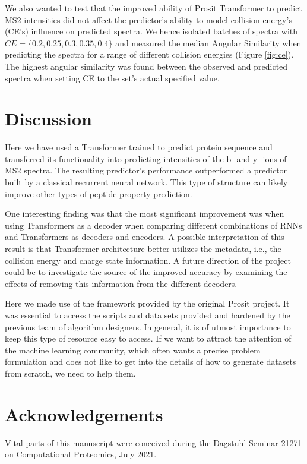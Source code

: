 \documentclass[10pt,a4paper]{article}
\begin{document}
We also wanted to test that the improved ability of Prosit Transformer to predict MS2 intensities did not affect the predictor’s ability to model collision energy’s (CE’s) influence on predicted spectra. We hence isolated batches of spectra with $\textit{CE}=\{0.2, 0.25, 0.3, 0.35, 0.4\}$ and measured the median Angular Similarity when predicting the spectra for a range of different collision energies (Figure \ref{fig:ce}). The highest angular similarity was found between the observed and predicted spectra when setting CE to the set’s actual specified value.

\section*{Discussion}
Here we have used a Transformer trained to predict protein sequence and transferred its functionality into predicting intensities of the b- and y- ions of MS2 spectra. The resulting predictor’s performance outperformed a predictor built by a classical recurrent neural network. This type of structure can likely improve other types of peptide property prediction.

One interesting finding was that the most significant improvement was when using Transformers as a decoder when comparing different combinations of RNNs and Transformers as decoders and encoders. A possible interpretation of this result is that Transformer architecture better utilizes the metadata, i.e., the collision energy and charge state information. A future direction of the project could be to investigate the source of the improved accuracy by examining the effects of removing this information from the different decoders.

Here we made use of the framework provided by the original Prosit project. It was essential to access the scripts and data sets provided and hardened by the previous team of algorithm designers. In general, it is of utmost importance to keep this type of resource easy to access. If we want to attract the attention of the machine learning community, which often wants a precise problem formulation and does not like to get into the details of how to generate datasets from scratch, we need to help them.


\section*{Acknowledgements}
Vital parts of this manuscript were conceived during the Dagstuhl Seminar 21271 on Computational Proteomics, July 2021.
\end{document}
